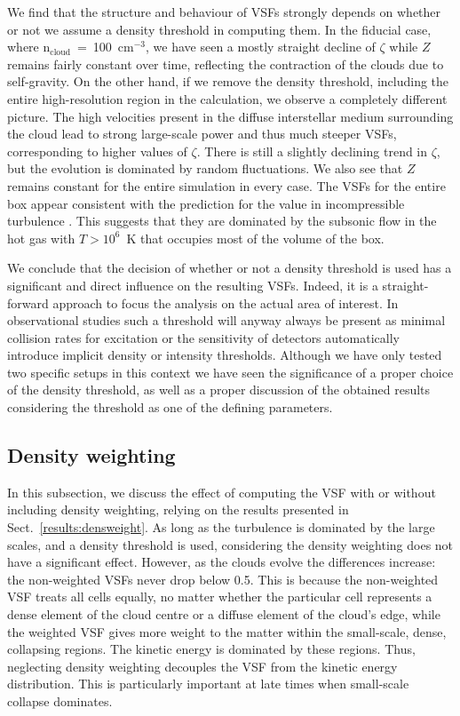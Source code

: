 We find that the structure and behaviour of VSFs strongly depends on whether or not we assume a density threshold in computing them.
In the fiducial case, where n$_\mathrm{cloud}$~=~100~cm$^{-3}$, we have seen a mostly straight decline of $\zeta$ while $Z$ remains fairly constant over time, reflecting the contraction of the clouds due to self-gravity.
On the other hand, if we remove the density threshold, including the entire high-resolution region in the calculation, we observe a completely different picture.
The high velocities present in the diffuse interstellar medium surrounding the cloud lead to strong large-scale power and thus much steeper VSFs, corresponding to higher values of $\zeta$. 
There is still a slightly declining trend in $\zeta$, but the evolution is dominated by random fluctuations.
We also see that $Z$ remains constant for the entire simulation in every case.
The VSFs for the entire box appear consistent with the prediction for the value in incompressible turbulence \citep{Boldyrev2002}. This suggests that they are dominated by the subsonic flow in the hot gas with $T > 10^6$~K that occupies most of the volume of the box.

We conclude that the decision of whether or not a density threshold is used has a significant and direct influence on the resulting VSFs.
Indeed, it is a straight-forward approach to focus the analysis on the actual area of interest.
In observational studies such a threshold will anyway always be present as minimal collision rates for excitation or the sensitivity of detectors automatically introduce implicit density or intensity thresholds. 
Although we have only tested two specific setups in this context we have seen the significance of a proper choice of the density threshold, as well as a proper discussion of the obtained results considering the threshold as one of the defining parameters.




\subsection{Density weighting}\label{discussion:densweight}


In this subsection, we discuss the effect of computing the VSF with or without including density weighting, relying on the results presented in Sect.~\ref{results:densweight}.
As long as the turbulence is dominated by the large scales, and a density threshold is used, considering the density weighting does not have a significant effect.
However, as the clouds evolve the differences increase:
the non-weighted VSFs never drop below 0.5.
This is because the non-weighted VSF treats all cells equally, no matter whether the particular cell represents a dense element of the cloud centre or a diffuse element of the cloud's edge, while the weighted VSF gives more weight to the matter within the small-scale, dense, collapsing regions.
The kinetic energy is dominated by these regions.
Thus, neglecting density weighting decouples the VSF from the kinetic energy distribution. 
This is particularly important at late times when small-scale collapse dominates.

